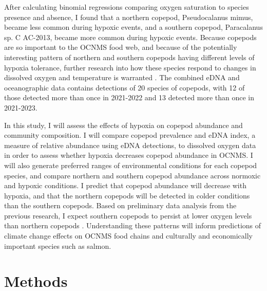 \documentclass[12pt,twoside]{reedthesis}
\begin{document}
{After calculating binomial regressions comparing oxygen saturation to species presence and absence, I found that a northern copepod, Pseudocalanus mimus, became less common during hypoxic events, and a southern copepod, Paracalanus sp. C AC-2013, became more common during hypoxic events. Because copepods are so important to the OCNMS food web, and because of the potentially interesting pattern of northern and southern copepods having different levels of hypoxia tolerance, further research into how these species respond to changes in dissolved oxygen and temperature is warranted \autocite{NOAAFisheries2024}. The combined eDNA and oceanographic data contains detections of 20 species of copepods, with 12 of those detected more than once in 2021-2022 and 13 detected more than once in 2021-2023.

In this study, I will assess the effects of hypoxia on copepod abundance and community composition. I will compare copepod prevalence and eDNA index, a measure of relative abundance using eDNA detections, to dissolved oxygen data in order to assess whether hypoxia decreases copepod abundance in OCNMS. I will also generate preferred ranges of environmental conditions for each copepod species, and compare northern and southern copepod abundance across normoxic and hypoxic conditions. I predict that copepod abundance will decrease with hypoxia, and that the northern copepods will be detected in colder conditions than the southern copepods. Based on preliminary data analysis from the previous research, I expect southern copepods to persist at lower oxygen levels than northern copepods \autocite{Crotty2024}. Understanding these patterns will inform predictions of climate change effects on OCNMS food chains and culturally and economically important species such as salmon.
	
    \chapter{Methods}

}
\end{document}
